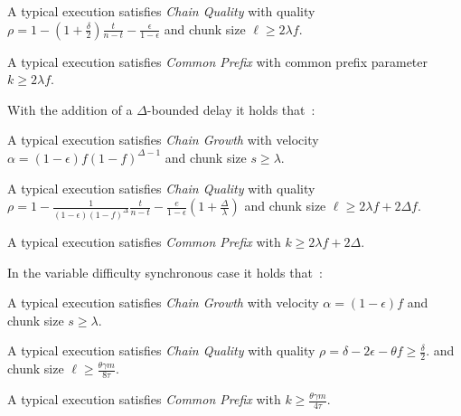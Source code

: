 \begin{theorem}
  A typical execution satisfies \emph{Chain Quality} with quality
  $\rho = 1 - (1 + \frac{\delta}{2})\frac{t}{n - t} - \frac{\epsilon}{1 - \epsilon}$
  and chunk size $\ell \geq 2\lambda f$.
\end{theorem}

\begin{theorem}
  A typical execution satisfies \emph{Common Prefix} with common prefix
  parameter $k \geq 2\lambda f$.
\end{theorem}

With the addition of a $\Delta$-bounded delay it holds that~\cite{backbone-new}:

\begin{theorem}
  A typical execution satisfies \emph{Chain Growth} with
  velocity $\alpha = (1 - \epsilon)f(1 - f)^{\Delta - 1}$
  and chunk size $s \geq \lambda$.
\end{theorem}

\begin{theorem}
  A typical execution satisfies \emph{Chain Quality} with
  quality
  $\rho = 1 - \frac{1}{(1 - \epsilon)(1 - f)^\Delta}\frac{t}{n - t} - \frac{e}{1 - \epsilon}(1 + \frac{\Delta}{\lambda})$
  and chunk size $\ell \geq 2\lambda f + 2\Delta f$.
\end{theorem}

\begin{theorem}
  A typical execution satisfies \emph{Common Prefix} with
  $k \geq 2\lambda f + 2\Delta$.
\end{theorem}

In the variable difficulty synchronous case it holds that~\cite{varbackbone}:

\begin{theorem}
  A typical execution satisfies \emph{Chain Growth} with
  velocity $\alpha = (1 - \epsilon)f$
  and chunk size $s \geq \lambda$.
\end{theorem}

\begin{theorem}
  A typical execution satisfies \emph{Chain Quality} with
  quality
  $\rho = \delta - 2\epsilon - \theta f \geq \frac{\delta}{2}$.
  and chunk size $\ell \geq \frac{\theta\gamma m}{8\tau}$.
\end{theorem}

\begin{theorem}
  A typical execution satisfies \emph{Common Prefix} with
  $k \geq \frac{\theta \gamma m}{4\tau}$.
\end{theorem}

